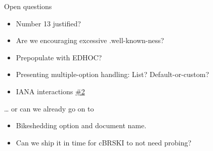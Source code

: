 \begin{frame}{Open questions}\Large
    \begin{itemize}
        \item Number 13 justified?
        \item Are we encouraging excessive .well-known-ness?
        \item Prepopulate with EDHOC?
        \item Presenting multiple-option handling: List? Default-or-custom?
        \item IANA interactions \href{https://github.com/chrysn/shopinc/issues/2}{\#2}
    \end{itemize}
    … or can we already go on to
    \begin{itemize}
        \item Bikeshedding option and document name.
        \item Can we ship it in time for cBRSKI to not need probing?
    \end{itemize}
\end{frame}


